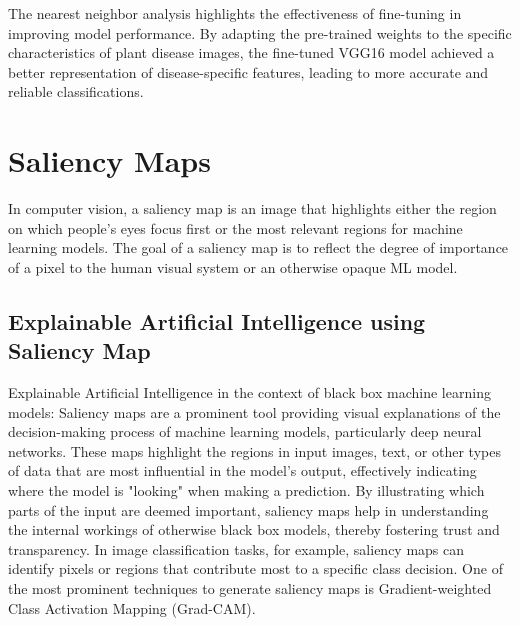 The nearest neighbor analysis highlights the effectiveness of fine-tuning in improving model performance. By adapting the pre-trained weights to the specific characteristics of plant disease images, the fine-tuned VGG16 model achieved a better representation of disease-specific features, leading to more accurate and reliable classifications.\par\vspace{1em}

\FloatBarrier

\newpage
\section{Saliency Maps}

In computer vision, a saliency map is an image that highlights either the region on which people's eyes focus first or the most relevant regions for machine learning models. The goal of a saliency map is to reflect the degree of importance of a pixel to the human visual system or an otherwise opaque ML model\cite{smap-paper}\cite{smap-paper-1}.\par \vspace{1em}


\subsection{Explainable Artificial Intelligence using Saliency Map}

Explainable Artificial Intelligence in the context of black box machine learning models: Saliency maps are a prominent tool providing visual explanations of the decision-making process of machine learning models, particularly deep neural networks. These maps highlight the regions in input images, text, or other types of data that are most influential in the model's output, effectively indicating where the model is "looking" when making a prediction. By illustrating which parts of the input are deemed important, saliency maps help in understanding the internal workings of otherwise black box models, thereby fostering trust and transparency. In image classification tasks, for example, saliency maps can identify pixels or regions that contribute most to a specific class decision. One of the most prominent techniques to generate saliency maps is Gradient-weighted Class Activation Mapping (Grad-CAM).

